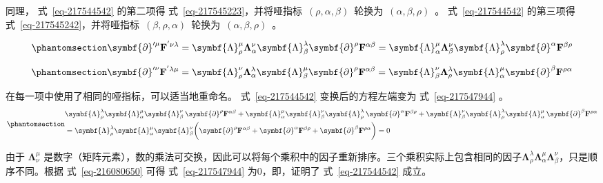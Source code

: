 \documentclass[
  chinese,
  a4paper,
  UTF8,
  12pt,
  oneside,
  openany]{ctexbook}
\begin{document}
同理， 式~\ref{eq-217544542} 的第二项得
式~\ref{eq-217545223}，并将哑指标~\((\rho,\alpha,\beta)\)~轮换为~\((\alpha,\beta,\rho)\)~。
式~\ref{eq-217544542} 的第三项得
式~\ref{eq-217545242}，并将哑指标~\((\beta,\rho,\alpha)\)~轮换为~\((\alpha,\beta,\rho)\)~。

\begin{equation}\protect\phantomsection\label{eq-217545223}{
\symbf{\partial}'^{\mu}\mathbf{F}^{'\nu\lambda} = \symbf{\Lambda}_{\rho}^{\mu}\mathbf{\Lambda}_{\alpha}^{\nu}\symbf{\Lambda}_{\beta}^{\lambda}\symbf{\partial}^{\rho}\mathbf{F}^{\alpha\beta} = \symbf{\Lambda}_{\alpha}^{\mu}\mathbf{\Lambda}_{\beta}^{\nu}\symbf{\Lambda}_{\rho}^{\lambda}\symbf{\partial}^{\alpha}\mathbf{F}^{\beta\rho}
}\end{equation}

\begin{equation}\protect\phantomsection\label{eq-217545242}{
\symbf{\partial}'^{\nu}\mathbf{F}^{'\lambda\mu} = \symbf{\Lambda}_{\rho}^{\nu}\mathbf{\Lambda}_{\alpha}^{\lambda}\symbf{\Lambda}_{\beta}^{\mu}\symbf{\partial}^{\rho}\mathbf{F}^{\alpha\beta} = \symbf{\Lambda}_{\beta}^{\nu}\mathbf{\Lambda}_{\rho}^{\lambda}\symbf{\Lambda}_{\alpha}^{\mu}\symbf{\partial}^{\beta}\mathbf{F}^{\rho\alpha}
}\end{equation}

在每一项中使用了相同的哑指标，可以适当地重命名。 式~\ref{eq-217544542}
变换后的方程左端变为 式~\ref{eq-217547944} 。
\begin{equation}\protect\phantomsection\label{eq-217547944}{
\begin{aligned}
& \symbf{\Lambda}_{\rho}^{\lambda} \symbf{\Lambda}_{\alpha}^{\mu} \symbf{\Lambda}_{\beta}^{\nu}\, \symbf{\partial}^{\rho}\mathbf{F}^{\alpha\beta} + \symbf{\Lambda}_{\alpha}^{\mu} \symbf{\Lambda}_{\beta}^{\nu} \symbf{\Lambda}_{\rho}^{\lambda}\, \symbf{\partial}^{\alpha}\mathbf{F}^{\beta\rho} + \symbf{\Lambda}_{\beta}^{\nu} \symbf{\Lambda}_{\rho}^{\lambda} \symbf{\Lambda}_{\alpha}^{\mu}\, \symbf{\partial}^{\beta}\mathbf{F}^{\rho\alpha} \\
&= \symbf{\Lambda}_{\rho}^{\lambda} \symbf{\Lambda}_{\alpha}^{\mu} \symbf{\Lambda}_{\beta}^{\nu}
\biggl( \symbf{\partial}^{\rho}\mathbf{F}^{\alpha\beta}
+ \symbf{\partial}^{\alpha}\mathbf{F}^{\beta\rho}
+ \symbf{\partial}^{\beta}\mathbf{F}^{\rho\alpha} \biggr)
= 0 \end{aligned}
}\end{equation}

由于 \(\symbf{\Lambda}_{\nu}^{\mu}\)
是数字（矩阵元素），数的乘法可交换，因此可以将每个乘积中的因子重新排序。三个乘积实际上包含相同的因子\(\symbf{\Lambda}_{\rho}^{\lambda}\mathbf{\Lambda}_{\alpha}^{\mu}\symbf{\Lambda}_{\beta}^{\nu}\)，只是顺序不同。根据
式~\ref{eq-216080650} 可得 式~\ref{eq-217547944} 为0，即，证明了
式~\ref{eq-217544542} 成立。
\end{document}
